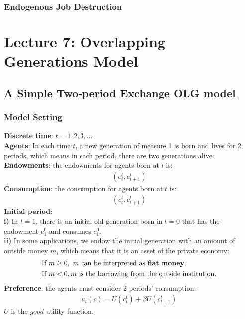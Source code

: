 \documentclass{article}
\begin{document}
\subsubsection{Endogenous Job Destruction}



\newpage
\section{Lecture 7: Overlapping Generations Model}
\subsection{A Simple Two-period Exchange OLG model}
\subsubsection{Model Setting}
\textbf{Discrete time}: $t = 1, 2, 3, \ldots$\\
\textbf{Agents}: In each time $t$, a new generation of measure 1 is born and lives for 2 periods, which means in each period, there are two generations alive.\\
\textbf{Endowments}: the endowments for agents born at $t$ is:
	\begin{align*}
		(e^t_{t}, e^t_{t+1})
	\end{align*} 
\textbf{Consumption}: the consumption for agents born at $t$ is:
	\begin{align*}
		(c^t_{t}, c^t_{t+1})
	\end{align*}
\textbf{Initial period}:\\
\indent \textbf{i)} In $t = 1$, there is an initial old generation born in $t = 0$ that has the endowment $e^0_1$ and consumes $c^0_1$.\\
\indent \textbf{ii)} In some applications, we endow the initial generation with an amount of outside money $m$, which means that it is an asset of the private economy:
	\begin{align*}
		&\text{If}\ m \geq 0,\ m\ \text{can be interpreted as \textbf{fiat money}.}\\
		&\text{If}\ m < 0, m\ \text{is the borrowing from the outside institution.}
	\end{align*}
\textbf{Preference}: the agents must consider 2 periods' consumption:
	\begin{align*}
		u_t(c) = U(c^t_t) + \beta U(c^t_{t+1})
	\end{align*}
$U$ is the $good$ utility function.
\end{document}
